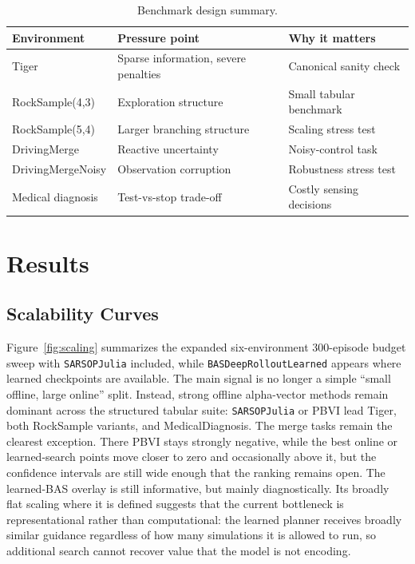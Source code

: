 \documentclass[10pt,twocolumn]{article}
\begin{document}
\begin{table}[t]
\centering
\caption{Benchmark design summary.}
\label{tab:design}
\scriptsize
\begin{tabular}{@{}>{\raggedright\arraybackslash}p{} >{\raggedright\arraybackslash}p{} >{\raggedright\arraybackslash}p{}@{}}
\toprule
Environment & Pressure point & Why it matters \\
\midrule
Tiger & Sparse information, severe penalties & Canonical sanity check \\
RockSample\allowbreak(4,3) & Exploration structure & Small tabular benchmark \\
RockSample\allowbreak(5,4) & Larger branching structure & Scaling stress test \\
DrivingMerge & Reactive uncertainty & Noisy-control task \\
DrivingMerge\allowbreak Noisy & Observation corruption & Robustness stress test \\
Medical diagnosis & Test-vs-stop trade-off & Costly sensing decisions \\
\bottomrule
\end{tabular}
\end{table}

\section{Results}

\subsection{Scalability Curves}
Figure~\ref{fig:scaling} summarizes the expanded six-environment 300-episode budget sweep with \texttt{SARSOPJulia} included, while \texttt{BASDeepRolloutLearned} appears where learned checkpoints are available. The main signal is no longer a simple ``small offline, large online'' split. Instead, strong offline alpha-vector methods remain dominant across the structured tabular suite: \texttt{SARSOPJulia} or PBVI lead Tiger, both RockSample variants, and MedicalDiagnosis. The merge tasks remain the clearest exception. There PBVI stays strongly negative, while the best online or learned-search points move closer to zero and occasionally above it, but the confidence intervals are still wide enough that the ranking remains open. The learned-BAS overlay is still informative, but mainly diagnostically. Its broadly flat scaling where it is defined suggests that the current bottleneck is representational rather than computational: the learned planner receives broadly similar guidance regardless of how many simulations it is allowed to run, so additional search cannot recover value that the model is not encoding.
\end{document}
